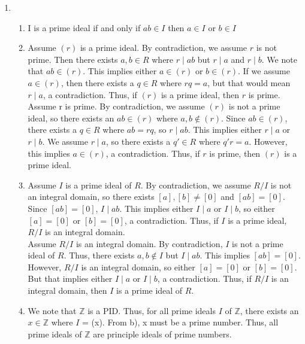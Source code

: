 \documentclass{article}
\begin{document}
\begin{enumerate}
\item
\begin{enumerate}
    \item 
    I is a prime ideal if and only if $ab \in I$ then $a \in I$ or $b \in I$\\

    \item
    Assume $(r)$ is a prime ideal. By contradiction, we assume $r$ is not prime. Then there exists $a, b \in R$ where $r \mid ab$ but $r \mid a$ and $r \mid b$. We note that $ab \in (r)$. This implies either $a \in (r)$ or $b \in (r)$. If we assume $a \in (r)$, then there exists a $q \in R$ where $rq = a$, but that would mean $r \mid a$, a contradiction. Thus, if $(r)$ is a prime ideal, then $r$ is prime. \\

    Assume r is prime. By contradiction, we assume $(r)$ is not a prime ideal, so there exists an $ab \in (r)$ where $a,b \notin (r)$. Since $ab \in (r)$, there exists a $q \in R$ where $ab = rq$, so $r \mid ab$. This implies either $r \mid a$ or $r \mid b$. We assume $r \mid a$, so there exists a $q' \in R$ where $q'r = a$. However, this implies $a \in (r)$, a contradiction. Thus, if $r$ is prime, then $(r)$ is a prime ideal. \\

    \item
    Assume $I$ is a prime ideal of $R$. By contradiction, we assume $R/I$ is not an integral domain, so there exists $[a], [b] \neq [0]$ and $[ab] = [0]$. Since $[ab] = [0]$, $I \mid ab$. This implies either $I\mid a$ or $I \mid b$, so either $[a] = [0]$ or $[b] = [0]$, a contradiction. Thus, if $I$ is a prime ideal, $R/I$ is an integral domain. \\

    Assume $R/I$ is an integral domain. By contradiction, $I$ is not a prime ideal of $R$. Thus, there exists $a,b \notin I$ but $I \mid ab$. This implies $[ab] = [0]$. However, $R/I$ is an integral domain, so either $[a] = [0]$ or $[b] = [0]$. But that implies either $I \mid a$ or $I \mid b$, a contradiction. Thus, if $R/I$ is an integral domain, then $I$ is a prime ideal of $R$.\\

    \item
    We note that $\mathbb{Z}$ is a PID. Thus, for all prime ideals $I$ of $\mathbb{Z}$, there exists an $x \in \mathbb{Z}$ where $I$ = (x). From b), x must be a prime number. Thus, all prime ideals of $\mathbb{Z}$ are principle ideals of prime numbers. \\


\end{enumerate}
\end{enumerate}
\end{document}
